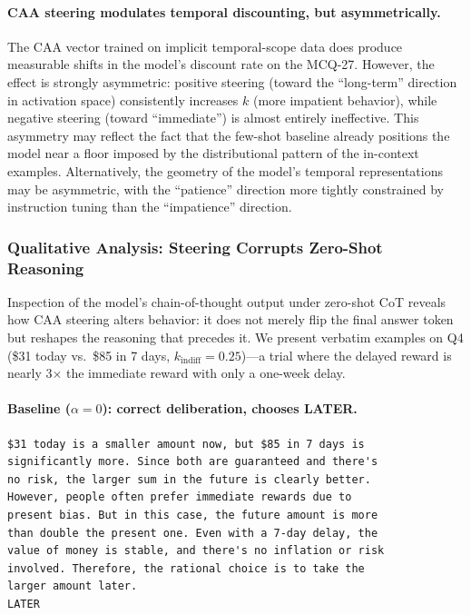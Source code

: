 \paragraph{CAA steering modulates temporal discounting, but asymmetrically.} The CAA vector trained on implicit temporal-scope data does produce measurable shifts in the model's discount rate on the MCQ-27. However, the effect is strongly asymmetric: positive steering (toward the ``long-term'' direction in activation space) consistently increases $k$ (more impatient behavior), while negative steering (toward ``immediate'') is almost entirely ineffective. This asymmetry may reflect the fact that the few-shot baseline already positions the model near a floor imposed by the distributional pattern of the in-context examples. Alternatively, the geometry of the model's temporal representations may be asymmetric, with the ``patience'' direction more tightly constrained by instruction tuning than the ``impatience'' direction.

\subsubsection{Qualitative Analysis: Steering Corrupts Zero-Shot Reasoning}
\label{sec:caa-reasoning}

Inspection of the model's chain-of-thought output under zero-shot CoT reveals how CAA steering alters behavior: it does not merely flip the final answer token but reshapes the reasoning that precedes it. We present verbatim examples on Q4 (\$31 today vs.\ \$85 in 7 days, $k_{\text{indiff}} = 0.25$)---a trial where the delayed reward is nearly 3$\times$ the immediate reward with only a one-week delay.

\paragraph{Baseline ($\alpha = 0$): correct deliberation, chooses LATER.}
\begin{lstlisting}[style=cot]
$31 today is a smaller amount now, but $85 in 7 days is
significantly more. Since both are guaranteed and there's
no risk, the larger sum in the future is clearly better.
However, people often prefer immediate rewards due to
present bias. But in this case, the future amount is more
than double the present one. Even with a 7-day delay, the
value of money is stable, and there's no inflation or risk
involved. Therefore, the rational choice is to take the
larger amount later.
LATER
\end{lstlisting}

